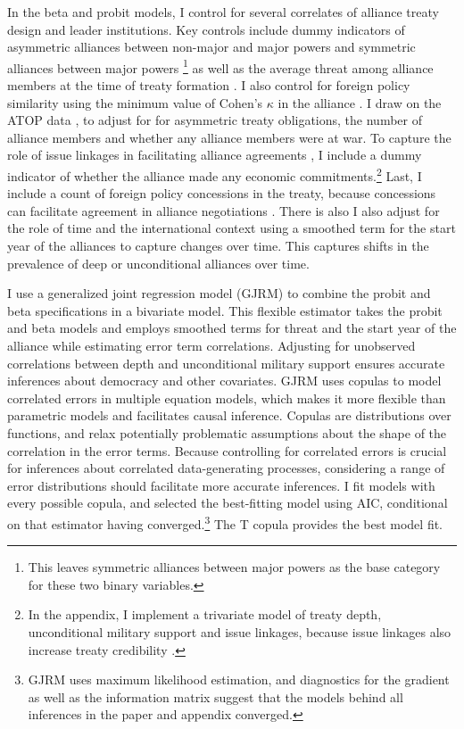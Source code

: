 \documentclass[12pt]{article}
\begin{document}
In the beta and probit models, I control for several correlates of alliance treaty design and leader institutions. 
Key controls include dummy indicators of asymmetric alliances between non-major and major powers and symmetric alliances between major powers \citep{Mattes2012}\footnote{This leaves symmetric alliances between major powers as the base category for these two binary variables.} as well as the average threat among alliance members at the time of treaty formation \citep{LeedsSavun2007}. 
I also control for foreign policy similarity using the minimum value of Cohen's $\kappa$ in the alliance \citep{Hage2011}.
I draw on the ATOP data \citep{Leedsetal2002}, to adjust for for asymmetric treaty obligations, the number of alliance members and whether any alliance members were at war. 
To capture the role of issue linkages in facilitating alliance agreements \citep{Poast2012}, I include a dummy indicator of whether the alliance made any economic commitments.\footnote{In the appendix, I implement a trivariate model of treaty depth, unconditional military support and issue linkages, because issue linkages also increase treaty credibility \citep{ Poast2013}.}  
Last, I include a count of foreign policy concessions in the treaty, because concessions can facilitate agreement in alliance negotiations \citep{Johnson2015}. 
There is also I also adjust for the role of time and the international context using a smoothed term for the start year of the alliances to capture changes over time.
This captures shifts in the prevalence of deep or unconditional alliances over time.  


I use a generalized joint regression model (GJRM) \citep{Braumoelleretal2018} to combine the probit and beta specifications in a bivariate model.
This flexible estimator takes the probit and beta models and employs smoothed terms for threat and the start year of the alliance while estimating error term correlations. 
Adjusting for unobserved correlations between depth and unconditional military support ensures accurate inferences about democracy and other covariates.
GJRM uses copulas to model correlated errors in multiple equation models, which makes it more flexible than parametric models and facilitates causal inference. 
Copulas are distributions over functions, and relax potentially problematic assumptions about the shape of the correlation in the error terms. 
Because controlling for correlated errors is crucial for inferences about correlated data-generating processes, considering a range of error distributions should facilitate more accurate inferences. 
I fit models with every possible copula, and selected the best-fitting model using AIC, conditional on that estimator having converged.\footnote{GJRM uses maximum likelihood estimation, and diagnostics for the gradient as well as the information matrix suggest that the models behind all inferences in the paper and appendix converged.} 
The T copula provides the best model fit.
\end{document}
